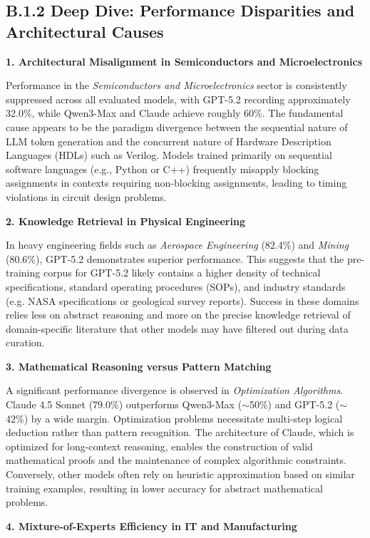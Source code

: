 \documentclass{article}
\theoremstyle{plain}
\theoremstyle{definition}
\theoremstyle{remark}
\begin{document}
\subsection*{B.1.2 Deep Dive: Performance Disparities and Architectural Causes}

\textbf{1. Architectural Misalignment in Semiconductors and Microelectronics}

Performance in the \textit{Semiconductors and Microelectronics} sector is consistently suppressed across all evaluated models, with GPT-5.2 recording approximately 32.0\%, while Qwen3-Max and Claude achieve roughly 60\%. The fundamental cause appears to be the paradigm divergence between the sequential nature of LLM token generation and the concurrent nature of Hardware Description Languages (HDLs) such as Verilog. Models trained primarily on sequential software languages (e.g., Python or C++) frequently misapply blocking assignments in contexts requiring non-blocking assignments, leading to timing violations in circuit design problems.

\textbf{2. Knowledge Retrieval in Physical Engineering}

In heavy engineering fields such as \textit{Aerospace Engineering} (82.4\%) and \textit{Mining} (80.6\%), GPT-5.2 demonstrates superior performance. This suggests that the pre-training corpus for GPT-5.2 likely contains a higher density of technical specifications, standard operating procedures (SOPs), and industry standards (e.g. NASA specifications or geological survey reports). Success in these domains relies less on abstract reasoning and more on the precise knowledge retrieval of domain-specific literature that other models may have filtered out during data curation.

\textbf{3. Mathematical Reasoning versus Pattern Matching}

A significant performance divergence is observed in \textit{Optimization Algorithms}. Claude 4.5 Sonnet (79.0\%) outperforms Qwen3-Max ($\sim$50\%) and GPT-5.2 ($\sim$42\%) by a wide margin. Optimization problems necessitate multi-step logical deduction rather than pattern recognition. The architecture of Claude, which is optimized for long-context reasoning, enables the construction of valid mathematical proofs and the maintenance of complex algorithmic constraints. Conversely, other models often rely on heuristic approximation based on similar training examples, resulting in lower accuracy for abstract mathematical problems.

\textbf{4. Mixture-of-Experts Efficiency in IT and Manufacturing}
\end{document}
